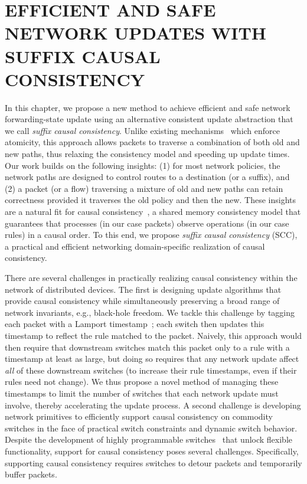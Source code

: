 \chapter{\uppercase{Efficient and Safe Network Updates with Suffix Causal Consistency}}
\label{chap:scc}

In this chapter, we propose a new method to achieve efficient and safe network forwarding-state update using an alternative consistent update abstraction that we call \textit{suffix causal consistency}.
Unlike existing mechanisms~\cite{swan,dionysus,espres,zupdate,incrementalcu,timedcu}
which enforce atomicity, this approach allows packets to traverse a combination of
both old and new paths, thus relaxing the consistency model and speeding up update
times.  Our work builds on the following insights: (1) for most
network policies, the network paths are designed to control routes to
a destination (or a suffix), and (2) a packet (or a flow) traversing a
mixture of old and new paths can retain correctness provided it
traverses the old policy and then the new. These insights are a
natural fit for causal consistency~\cite{causal}, a shared memory
consistency model that guarantees that processes (in our case packets)
observe operations (in our case rules) in a causal order.  To this
end, we propose \textit{suffix causal consistency} (SCC), a practical and
efficient networking domain-specific realization of causal
consistency.

There are several challenges in practically realizing causal
consistency within the network of distributed devices.  The first is
designing update algorithms that provide causal consistency while
simultaneously preserving a broad range of network invariants,
e.g., black-hole freedom.  We tackle this challenge by tagging each
packet with a Lamport timestamp~\cite{LamportClock}; each switch then
updates this timestamp to reflect the rule matched to the packet.
Naively, this approach would then require that downstream switches
match this packet only to a rule with a timestamp at least as large,
but doing so requires that any network update affect \textit{all} of
these downstream switches (to increase their rule timestamps, even if
their rules need not change).  We thus propose a novel method of
managing these timestamps to limit the number of switches that each
network update must involve, thereby accelerating the update process.
A second challenge is developing network primitives to efficiently
support causal consistency on commodity switches in the face of
practical switch constraints and dynamic switch behavior. Despite the
development of highly programmable switches~\cite{P4Switch} that
unlock flexible functionality, support for causal consistency poses
several challenges. Specifically, supporting causal consistency
requires switches to detour packets and temporarily buffer
packets.

